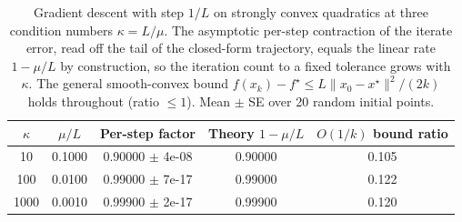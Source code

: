 \begin{table}[h]
\centering
\caption{Gradient descent with step $1/L$ on strongly convex quadratics at three condition numbers $\kappa = L/\mu$. The asymptotic per-step contraction of the iterate error, read off the tail of the closed-form trajectory, equals the linear rate $1 - \mu/L$ by construction, so the iteration count to a fixed tolerance grows with $\kappa$. The general smooth-convex bound $f(x_k) - f^\star \leq L\|x_0 - x^\star\|^2/(2k)$ holds throughout (ratio $\leq 1$). Mean $\pm$ SE over 20 random initial points.}
\label{tab:prelim_gd}
\begin{tabular}{ccccc}
\hline
$\kappa$ & $\mu/L$ & Per-step factor & Theory $1-\mu/L$ & $O(1/k)$ bound ratio \\
\hline
10 & 0.1000 & 0.90000 $\pm$ 4e-08 & 0.90000 & 0.105 \\
100 & 0.0100 & 0.99000 $\pm$ 7e-17 & 0.99000 & 0.122 \\
1000 & 0.0010 & 0.99900 $\pm$ 2e-17 & 0.99900 & 0.120 \\
\hline
\end{tabular}
\end{table}
